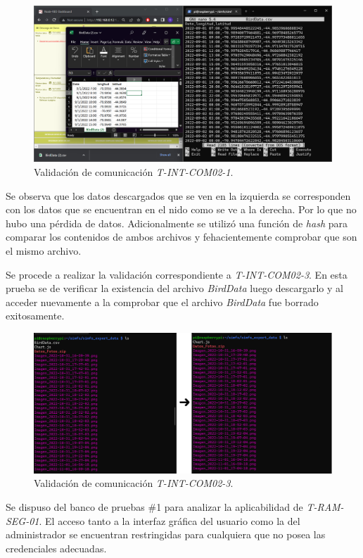 \begin{figure}[H]
\centering
        	\includegraphics[width=1\linewidth]{ImagenesValidacion del prototipo/TINTCOM21}
	\caption{Validación de comunicación \textit{T-INT-COM02-1}.}
\end{figure}
Se observa que los datos descargados que se ven en la izquierda se corresponden con los datos que se encuentran en el nido como se ve a la derecha. Por lo que no hubo una pérdida de datos.
Adicionalmente se utilizó una función de \textit{hash} para comparar los contenidos de ambos archivos y fehacientemente comprobar que son el mismo archivo. 

Se procede a realizar la validación correspondiente a \textit{T-INT-COM02-3}. En esta prueba se de verificar la existencia del archivo \textit{BirdData} luego descargarlo y al acceder nuevamente a la \rspi comprobar que el archivo \textit{BirdData} fue borrado exitosamente.
\begin{figure}[H]
\centering
        	\includegraphics[width=1\linewidth]{ImagenesValidacion del prototipo/TINTCOM23}
	\caption{Validación de comunicación \textit{T-INT-COM02-3}.}
\end{figure}



Se dispuso del banco de pruebas \#1 para analizar la aplicabilidad de \textit{T-RAM-SEG-01}. El acceso tanto a la interfaz gráfica del usuario como la del administrador se encuentran restringidas para cualquiera que no posea las credenciales adecuadas.

